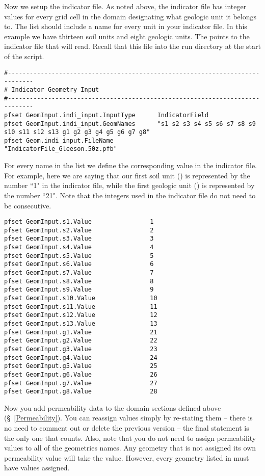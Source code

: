 Now we setup the indicator file. As noted above, the indicator  file has integer values for every grid
cell in the domain designating what geologic unit it belongs to. The  list
should include a name for every unit in your indicator file. In this example we have thirteen soil
units and eight geologic units. The  points to the indicator file that \parflow{}
will read. Recall that this file into the run directory at the start of the script. 

\begin{verbatim}
#-----------------------------------------------------------------------------
# Indicator Geometry Input
#-----------------------------------------------------------------------------
pfset GeomInput.indi_input.InputType      IndicatorField
pfset GeomInput.indi_input.GeomNames      "s1 s2 s3 s4 s5 s6 s7 s8 s9 s10 s11 s12 s13 g1 g2 g3 g4 g5 g6 g7 g8"
pfset Geom.indi_input.FileName            "IndicatorFile_Gleeson.50z.pfb"
\end{verbatim}

For every name in the  list we define the corresponding value in the indicator file. 
For example, here we are saying that our first soil unit () is represented by the number ``1"
in the indicator file, while the first geologic unit () is represented by the number ``21".
Note that the integers used in the indicator file do not need to be consecutive.

\begin{verbatim}
pfset GeomInput.s1.Value                1
pfset GeomInput.s2.Value                2
pfset GeomInput.s3.Value                3
pfset GeomInput.s4.Value                4
pfset GeomInput.s5.Value                5
pfset GeomInput.s6.Value                6
pfset GeomInput.s7.Value                7
pfset GeomInput.s8.Value                8
pfset GeomInput.s9.Value                9
pfset GeomInput.s10.Value               10
pfset GeomInput.s11.Value               11
pfset GeomInput.s12.Value               12
pfset GeomInput.s13.Value               13
pfset GeomInput.g1.Value                21
pfset GeomInput.g2.Value                22
pfset GeomInput.g3.Value                23
pfset GeomInput.g4.Value                24
pfset GeomInput.g5.Value                25
pfset GeomInput.g6.Value                26
pfset GeomInput.g7.Value                27
pfset GeomInput.g8.Value                28
\end{verbatim}

Now you add permeability data to the domain sections defined above (\S~\ref{Permeability}).  
You can reassign values simply by re-stating them -- there is no need to comment out or 
delete the previous version -- the final statement is the only one that counts. Also, note
that you do not need to assign permeability values to all of the geometries names. 
Any geometry that is not assigned its own permeability value will take the 
value. However, every geometry listed in  must have 
values assigned. 

